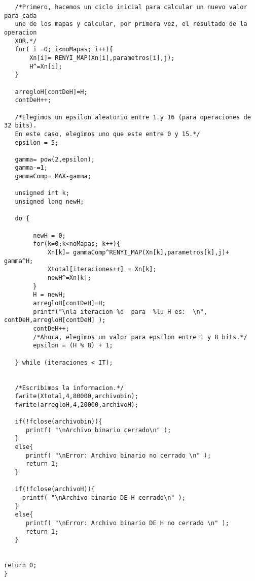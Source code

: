 \documentclass[12pt,3p]{elsarticle}
\begin{document}
\begin{verbatim}
   /*Primero, hacemos un ciclo inicial para calcular un nuevo valor para cada
   uno de los mapas y calcular, por primera vez, el resultado de la operacion
   XOR.*/
   for( i =0; i<noMapas; i++){
       Xn[i]= RENYI_MAP(Xn[i],parametros[i],j);
       H^=Xn[i];
   }
   
   arregloH[contDeH]=H; 
   contDeH++;
 
   /*Elegimos un epsilon aleatorio entre 1 y 16 (para operaciones de 32 bits).
   En este caso, elegimos uno que este entre 0 y 15.*/
   epsilon = 5;   
  
   gamma= pow(2,epsilon);
   gamma-=1;
   gammaComp= MAX-gamma;
    
   unsigned int k;
   unsigned long newH;

   do {
        
        newH = 0;
        for(k=0;k<noMapas; k++){            
            Xn[k]= gammaComp^RENYI_MAP(Xn[k],parametros[k],j)+ gamma^H;
            Xtotal[iteraciones++] = Xn[k];
            newH^=Xn[k];      
        }
        H = newH;
        arregloH[contDeH]=H;
        printf("\nla iteracion %d  para  %lu H es:  \n", contDeH,arregloH[contDeH] );
        contDeH++;
        /*Ahora, elegimos un valor para epsilon entre 1 y 8 bits.*/
        epsilon = (H % 8) + 1;  

   } while (iteraciones < IT);
 

   /*Escribimos la informacion.*/
   fwrite(Xtotal,4,80000,archivobin); 
   fwrite(arregloH,4,20000,archivoH); 

   if(!fclose(archivobin)){
      printf( "\nArchivo binario cerrado\n" );
   }
   else{
      printf( "\nError: Archivo binario no cerrado \n" );
      return 1;
   }  

   if(!fclose(archivoH)){
     printf( "\nArchivo binario DE H cerrado\n" );
   }
   else{
      printf( "\nError: Archivo binario DE H no cerrado \n" );
      return 1;
   }
   

return 0;
}
\end{verbatim}
\end{document}
